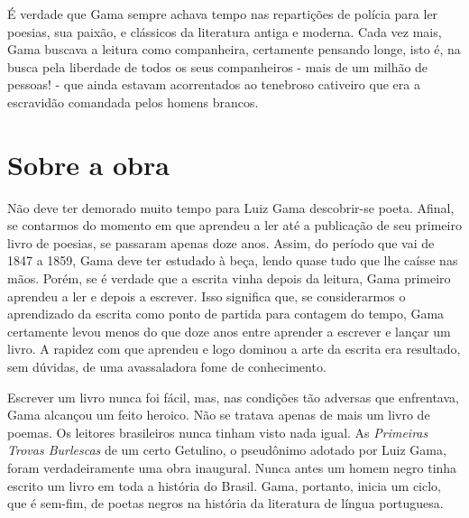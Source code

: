 É verdade que Gama sempre achava tempo nas repartições de polícia para
ler poesias, sua paixão, e clássicos da literatura antiga e moderna.
Cada vez mais, Gama buscava a leitura como companheira, certamente
pensando longe, isto é, na busca pela liberdade de todos os seus
companheiros - mais de um milhão de pessoas! - que ainda estavam
acorrentados ao tenebroso cativeiro que era a escravidão comandada pelos
homens brancos.

\section{Sobre a obra}

Não deve ter demorado muito tempo para Luiz Gama descobrir-se poeta.
Afinal, se contarmos do momento em que aprendeu a ler até a publicação
de seu primeiro livro de poesias, se passaram apenas doze anos. Assim, do
período que vai de 1847 a 1859, Gama deve ter estudado à beça, lendo
quase tudo que lhe caísse nas mãos. Porém, se é verdade que a escrita
vinha depois da leitura, Gama primeiro aprendeu a ler e depois a
escrever. Isso significa que, se considerarmos o aprendizado da escrita
como ponto de partida para contagem do tempo, Gama certamente levou
menos do que doze anos entre aprender a escrever e lançar um livro. A
rapidez com que aprendeu e logo dominou a arte da escrita era resultado,
sem dúvidas, de uma avassaladora fome de conhecimento.

Escrever um livro nunca foi fácil, mas, nas condições tão adversas que
enfrentava, Gama alcançou um feito heroico. Não se tratava apenas de
mais um livro de poemas. Os leitores brasileiros nunca tinham visto nada
igual. As \emph{Primeiras Trovas Burlescas} de um certo Getulino, o
pseudônimo adotado por Luiz Gama, foram verdadeiramente uma obra
inaugural. Nunca antes um homem negro tinha escrito um livro em toda a
história do Brasil. Gama, portanto, inicia um ciclo, que é sem-fim, de
poetas negros na história da literatura de língua portuguesa.

